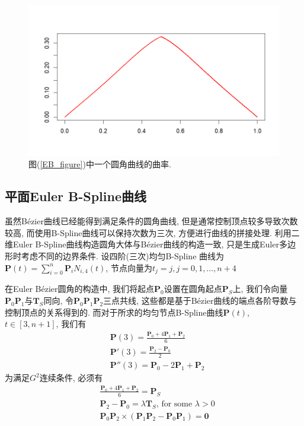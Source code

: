 \documentclass[utf8]{ctexart} %
\numberwithin{figure}{section}
\numberwithin{equation}{section}
\begin{document}
	 \begin{figure}[htbp]
	 	\centering
	 	\includegraphics[width=0.7\linewidth]{figures/SixEdges_EulerBezier.png}
	 	\caption{图(\ref{EB_figure})中一个圆角曲线的曲率. }
	 \end{figure}
	 \subsection{平面Euler B-Spline曲线}
	 虽然B\'ezier曲线已经能得到满足条件的圆角曲线, 但是通常控制顶点较多导致次数较高, 而使用B-Spline曲线可以保持次数为三次, 方便进行曲线的拼接处理. 利用二维Euler B-Spline曲线构造圆角大体与B\'{e}zier曲线的构造一致, 只是生成Euler多边形时考虑不同的边界条件.  设四阶(三次)均匀B-Spline 曲线为$\boldsymbol{P}(t)=\sum_{i=0}^n\boldsymbol{P}_iN_{i,4}(t)$, 节点向量为$t_j = j,j=0,1,\dots,n+4$ \par 
	 在Euler B\'{e}zier圆角的构造中, 我们将起点$\boldsymbol{P}_0$设置在圆角起点$\boldsymbol{P}_S$上, 我们令向量$\boldsymbol{P}_0\boldsymbol{P}_1$与$\boldsymbol{T}_S$同向, 令$\boldsymbol{P}_0$$\boldsymbol{P}_1$$\boldsymbol{P}_2$三点共线, 这些都是基于B\'{e}zier曲线的端点各阶导数与控制顶点的关系得到的. 而对于所求的均匀节点B-Spline曲线$\boldsymbol{P}(t)$, $t\in[3,n+1]$, 我们有
	 \begin{equation}
	 \begin{aligned}
	 &\boldsymbol{P}(3)=\frac{\boldsymbol{P}_0+4\boldsymbol{P}_1+\boldsymbol{P}_2}6\\
	 &\boldsymbol{P}'(3)=\frac{\boldsymbol{P}_2-\boldsymbol{P}_0}2\\
	 &\boldsymbol{P}''(3)=\boldsymbol{P}_0-2\boldsymbol{P}_1+\boldsymbol{P}_2
	 \end{aligned}
	 \end{equation}
	 为满足$G^2$连续条件, 必须有
	 \begin{equation}\label{EBS_condition}
	 \begin{aligned}
	 &\frac{\boldsymbol{P}_0+4\boldsymbol{P}_1+\boldsymbol{P}_2}6=\boldsymbol{P}_S\\
	 &\boldsymbol{P}_2-\boldsymbol{P}_0=\lambda\boldsymbol{T}_S\text{, for some }\lambda>0\\
	 &\boldsymbol{P}_0\boldsymbol{P}_2\times(\boldsymbol{P}_1\boldsymbol{P}_2-\boldsymbol{P}_0\boldsymbol{P}_1)=\boldsymbol{0}
	 \end{aligned}
	 \end{equation}
\end{document}
